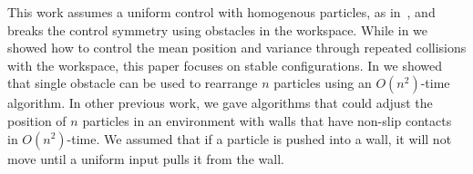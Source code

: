  This work assumes a uniform control with homogenous particles, as in~\cite{AaronManipulation2013}, and breaks the control symmetry using obstacles in the workspace. 
  While in \cite{shahrokhi2018TRO} we showed how to control the mean position and variance through repeated collisions with the workspace, this paper focuses on stable configurations. 
   In \cite{AaronManipulation2013} we showed that single obstacle can be used to rearrange $n$ particles using an $O(n^2)$-time algorithm.
   In other previous work, we gave algorithms that could adjust the position of $n$ particles in an environment with walls that have non-slip contacts~\cite{shahrokhi2017} in $O(n^2)$-time. We assumed that if a particle is pushed into a wall, it will not move until a uniform input pulls it from the wall.
 



